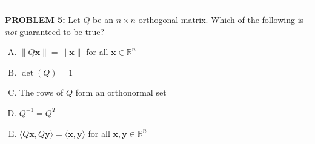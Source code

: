 \documentclass[12pt]{amsart}
\newcommand{\divider}{
  \vspace{-1em} %
  \noindent
  \raisebox{-0.15ex}{\textbullet}%
  \hspace{0.5em}%
  \rule[0.5ex]{0.95\textwidth}{1.0pt}%
  \hspace{0.5em}%
  \raisebox{-0.15ex}{\textbullet}%
  \vspace{0em} %
}
\begin{document}
%
\divider


{\bf PROBLEM 5:}
%
Let $Q$ be an $n \times n$ orthogonal matrix. Which of the following is \emph{not} guaranteed to be true?

\begin{enumerate}[(A)]
\item $\|Q\mathbf{x}\| = \|\mathbf{x}\|$ for all $\mathbf{x} \in \mathbb{R}^n$
\item $\det(Q) = 1$
\item The rows of $Q$ form an orthonormal set
\item $Q^{-1} = Q^T$
\item $\langle Q\mathbf{x}, Q\mathbf{y} \rangle = \langle \mathbf{x}, \mathbf{y} \rangle$ for all $\mathbf{x}, \mathbf{y} \in \mathbb{R}^n$
\end{enumerate}
\end{document}
